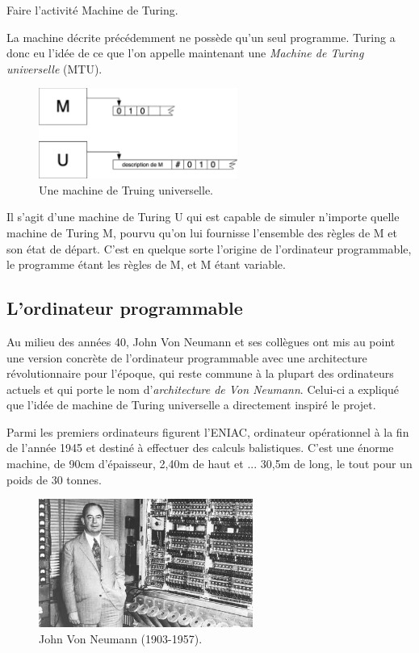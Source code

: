 \begin{exercice}[]
    Faire l'activité \og Machine de Turing\fg.
\end{exercice}

La machine décrite précédemment ne possède qu'un seul programme. Turing a donc eu l'idée de ce que l'on appelle maintenant une
\textit{Machine de Turing universelle} (MTU).

\begin{figure}[H]
    \begin{center}
        \includegraphics[width=6.5cm]{ch-turing/img/mtu.png}
    \end{center}
    \caption*{Une machine de Truing universelle.}
\end{figure}

Il s'agit d'une machine de Turing U qui est capable de simuler n'importe quelle machine de Turing M,
pourvu qu'on lui fournisse l'ensemble des règles de M et son état de départ. C'est en quelque sorte l'origine de l'ordinateur
programmable, le programme étant les règles de M, et M étant variable.

\subsection{L'ordinateur programmable}

Au milieu des années 40, John Von Neumann et ses collègues ont mis au point une version concrète de l'ordinateur programmable avec une architecture révolutionnaire pour l'époque, qui reste commune à la plupart des ordinateurs actuels et qui porte le nom d'\textit{architecture de Von Neumann}. Celui-ci a expliqué que l'idée de machine de Turing universelle a directement inspiré le projet.

Parmi les premiers ordinateurs figurent l'ENIAC, ordinateur opérationnel à la fin de l'année 1945 et destiné à effectuer des calculs balistiques. C'est une énorme machine, de 90cm d'épaisseur, 2,40m de haut et ... 30,5m de long, le tout pour un poids de 30 tonnes.

\begin{figure}[H]
    \begin{center}
        \includegraphics[width=7cm]{ch-turing/img/vonneumann}
    \end{center}
    \caption*{John Von Neumann (1903-1957).}
\end{figure}

